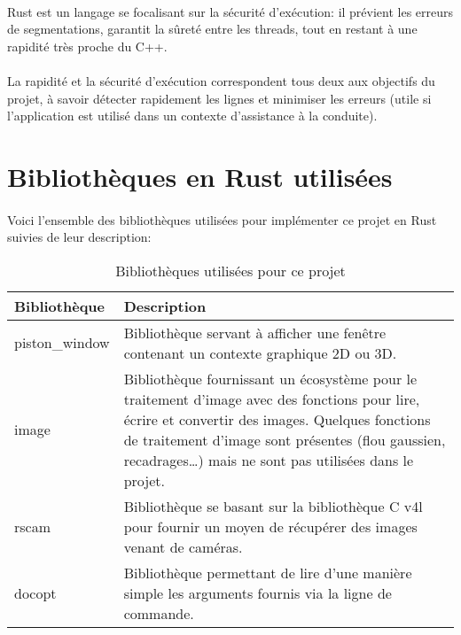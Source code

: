 \documentclass{report}
\begin{document}
\paragraph{} Rust est un langage se focalisant sur la sécurité d'exécution: il
prévient les erreurs de segmentations, garantit la sûreté entre les threads,
tout en restant à une rapidité très proche du C++.

\paragraph{} La rapidité et la sécurité d'exécution correspondent tous deux aux
objectifs du projet, à savoir détecter rapidement les lignes et minimiser les
erreurs (utile si l'application est utilisé dans un contexte d'assistance à la
conduite).

\section{Bibliothèques en Rust utilisées}

\paragraph{} Voici l'ensemble des bibliothèques utilisées pour implémenter ce
projet en Rust suivies de leur description:

\begin{table}[H]
	\centering
	\begin{tabular}{lp{10cm}}
		\toprule
		Bibliothèque & Description\\
		\midrule
		piston\_window & Bibliothèque servant à afficher une fenêtre contenant
		un contexte graphique 2D ou 3D.\\

		image & Bibliothèque fournissant un écosystème pour le traitement
		d'image avec des fonctions pour lire, écrire et convertir des images.
		Quelques fonctions de traitement d'image sont présentes (flou gaussien,
		recadrages\ldots) mais ne sont pas utilisées dans le projet.\\

		rscam & Bibliothèque se basant sur la bibliothèque C v4l pour fournir
		un moyen de récupérer des images venant de caméras.\\

		docopt & Bibliothèque permettant de lire d'une manière simple les
		arguments fournis via la ligne de commande.\\
		\bottomrule
	\end{tabular}%
	\label{tab:libs}
	\caption{Bibliothèques utilisées pour ce projet}
\end{table}
\end{document}
